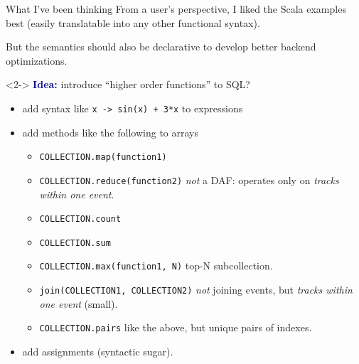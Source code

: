 \documentclass{beamer}
\begin{document}
\begin{frame}{What I've been thinking}
\vspace{0.25 cm}
From a user's perspective, I liked the Scala examples best (easily translatable into any other functional syntax).

\vspace{0.25 cm}
But the semantics should also be declarative to develop better backend optimizations.

\vspace{0.25 cm}
\begin{uncoverenv}<2->
\textcolor{darkblue}{\bf Idea:} introduce ``higher order functions'' to SQL?
\begin{itemize}
\item add syntax like {\tt x -> sin(x) + 3*x} to expressions
\item add methods like the following to arrays
\begin{itemize}
\item {\tt \scriptsize COLLECTION.map(function1)}
\item {\tt \scriptsize COLLECTION.reduce(function2)} {\it not} a DAF: operates only on {\it tracks within one event}.
\item {\tt \scriptsize COLLECTION.count}
\item {\tt \scriptsize COLLECTION.sum}
\item {\tt \scriptsize COLLECTION.max(function1, N)} top-N subcollection.
\item {\tt \scriptsize join(COLLECTION1, COLLECTION2)} {\it not} joining events, but {\it tracks within one event} (small).
\item {\tt \scriptsize COLLECTION.pairs} like the above, but unique pairs of indexes.
\end{itemize}
\item add assignments (syntactic sugar).
\end{itemize}
\end{uncoverenv}
\end{frame}

\begin{frame}{}

\end{frame}
\end{document}

